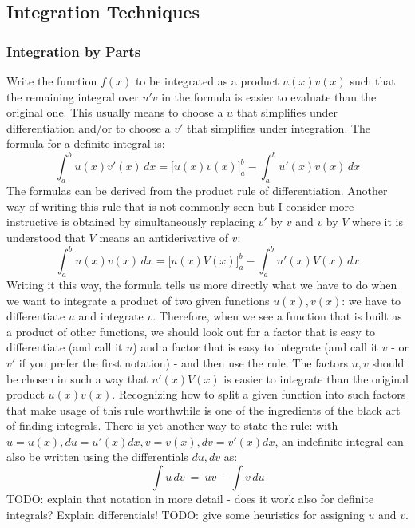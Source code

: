 %
%
%

\subsection{Integration Techniques} 

\subsubsection{Integration by Parts} 
Write the function $f(x)$ to be integrated as a product $u(x)v(x)$ such that the remaining integral over $u' v$ in the formula is easier to evaluate than the original one. This usually means to choose a $u$ that simplifies under differentiation and/or to choose a $v'$ that simplifies under integration. The formula for a definite integral is:
\begin{equation}
  \int_a^b u(x) v'(x) \, dx = \Big[u(x) v(x)\Big]_a^b - \int_a^b u'(x) v(x) \, dx
\end{equation}
The formulas can be derived from the product rule of differentiation. Another way of writing this rule that is not commonly seen but I consider more instructive is obtained by simultaneously replacing $v'$ by $v$ and $v$ by $V$ where it is understood that $V$ means an antiderivative of $v$:
\begin{equation}
  \int_a^b u(x) v(x) \, dx = \Big[u(x) V(x)\Big]_a^b - \int_a^b u'(x) V(x) \, dx
\end{equation}
Writing it this way, the formula tells us more directly what we have to do when we want to integrate a product of two given functions $u(x), v(x)$: we have to differentiate $u$ and integrate $v$. Therefore, when we see a function that is built as a product of other functions, we should look out for a factor that is easy to differentiate (and call it $u$) and a factor that is easy to integrate (and call it $v$ - or $v'$ if you prefer the first notation) - and then use the rule. The factors $u,v$ should be chosen in such a way that $u'(x) V(x)$ is easier to integrate than the original product $u(x) v(x)$. Recognizing how to split a given function into such factors that make usage of this rule worthwhile is one of the ingredients of the black art of finding integrals. There is yet another way to state the rule: with $u = u(x), du = u'(x) dx, v = v(x), dv = v'(x) dx$, an indefinite integral can also be written using the differentials $du, dv$ as:
\begin{equation}
  \int u \, dv \ =\ uv - \int v \, du
\end{equation}
TODO: explain that notation in more detail - does it work also for definite integrals? Explain differentials! TODO: give some heuristics for assigning $u$ and $v$. 


